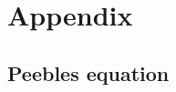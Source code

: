\documentclass[a4paper,11pt]{article}
\begin{document}


%
%

\clearpage
\appendix
\section{Appendix}
\label{sec:appendix}

\subsection{Peebles equation}
\label{app:peebles}

%
\end{document}
